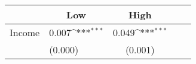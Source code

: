 {
\def\sym#1{\ifmmode^{#1}\else\(^{#1}\)\fi}
\begin{tabular*}{.4\hsize}{@{\hskip\tabcolsep\extracolsep\fill}l*{2}{lc}}
\toprule
                &\multicolumn{1}{c}{Low}&\multicolumn{1}{c}{High}\\
\midrule
Income          &    0.007\sym{***}&    0.049\sym{***}\\
                &  (0.000)         &  (0.001)         \\
\bottomrule
\end{tabular*}
}
